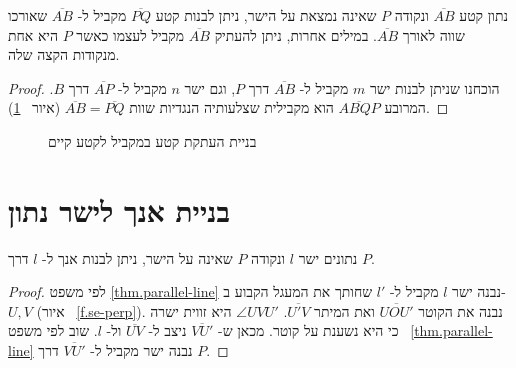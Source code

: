 \begin{theorem}
נתון קטע 
$\overline{AB}$
ונקודה 
$P$
שאינה נמצאת על הישר, ניתן לבנות קטע 
$\overline{PQ}$
מקביל ל-%
$\overline{AB}$
שאורכו שווה לאורך
$\overline{AB}$.
במילים אחרות, ניתן להעתיק 
$\overline{AB}$
מקביל לעצמו כאשר 
$P$
היא אחת מנקודות הקצה שלה.
\end{theorem}

\begin{proof}
הוכחנו שניתן לבנות ישר
$m$
מקביל ל-%
$\overline{AB}$
דרך 
$P$,
וגם ישר
$n$
מקביל ל-%
$\overline{AP}$
דרך
$B$.
המרובע
$\overline{ABQP}$
הוא מקבילית שצלעותיה הנגדיות שוות 
$\overline{AB}=\overline{PQ}$
(איור%
~\ref{f.se-parallel-other4}).
\end{proof}

\begin{figure}[tb]
\begin{center}
\caption{בניית העתקת קטע במקביל לקטע קיים}\label{f.se-parallel-other4}
\end{center}
\end{figure}


\section{בניית אנך לישר נתון}\label{s.perpendicular}

\begin{theorem}\label{thm.perpendicular}
נתונים ישר
$l$
ונקודה
$P$
שאינה על הישר, ניתן לבנות אנך ל-%
$l$
דרך
$P$.%
\end{theorem}

\begin{proof}
לפי משפט
\ref{thm.parallel-line}
נבנה ישר
$l$
מקביל ל-%
$l'$
שחותך את המעגל הקבוע ב-%
$U,V$
(איור%
~\ref{f.se-perp}).
נבנה את הקוטר
$\overline{UOU'}$
ואת המיתר
$\overline{U'V}$.
$\angle UVU'$
היא זווית ישרה כי היא נשענת על קוטר. מכאן ש-%
$\overline{VU'}$
ניצב ל-%
$\overline{UV}$
ול-%
$l$.
שוב לפי משפט%
~\ref{thm.parallel-line}
נבנה ישר מקביל ל-%
$\overline{VU'}$
דרך
$P$.
\end{proof}

